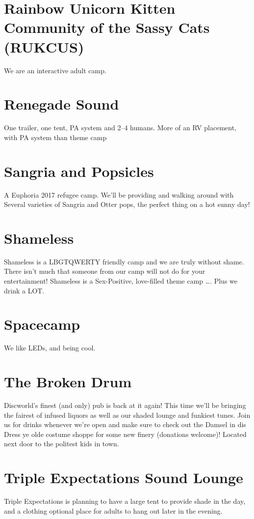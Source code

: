 \begin{multicols}{2}
\section*{Rainbow Unicorn Kitten Community of the Sassy Cats (RUKCUS)}
We are an interactive adult camp. 


\section*{Renegade Sound}
One trailer, one tent, PA system and 2--4 humans. More of an RV placement, with PA system than theme camp


\section*{Sangria and Popsicles}
A Euphoria 2017 refugee camp. We'll be providing and walking around with Several varieties of Sangria and Otter pops, the perfect thing on a hot sunny day!




\section*{Shameless}
Shameless is a LBGTQWERTY friendly camp and we are truly without shame. There isn’t much that someone from our camp will not do for your entertainment! Shameless is a Sex-Positive, love-filled theme camp …. Plus we drink a LOT. 


\section*{Spacecamp}
We like LEDs, and being cool.

\section*{The Broken Drum}

Discworld's finest (and only) pub is back at it again! This time we'll be bringing the fairest of infused liquors as well as our shaded lounge and funkiest tunes. Join us for drinks whenever we're open and make sure to check out the Damsel in dis Dress ye olde costume shoppe for some new finery (donations welcome)! Located next door to the politest kids in town.




\section*{Triple Expectations Sound Lounge}
Triple Expectations is planning to have a large tent to provide shade in the day, and a clothing optional place for adults to hang out later in the evening. 



\end{multicols}
